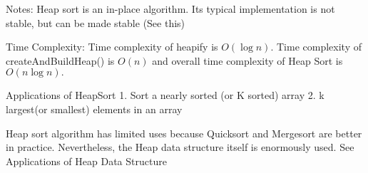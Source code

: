 \documentclass{article}
\begin{document}
Notes:
Heap sort is an in-place algorithm.
Its typical implementation is not stable, but can be made stable (See this)

Time Complexity: Time complexity of heapify is $O(\log n)$. Time complexity of createAndBuildHeap() is $O(n)$ and overall time complexity of Heap Sort is $O(n\log n).$

Applications of HeapSort
1. Sort a nearly sorted (or K sorted) array
2. k largest(or smallest) elements in an array

Heap sort algorithm has limited uses because Quicksort and Mergesort are better in practice. Nevertheless, the Heap data structure itself is enormously used. See Applications of Heap Data Structure
\end{document}
